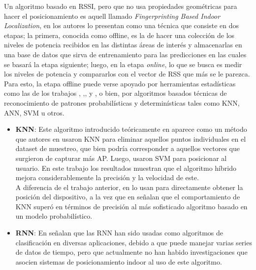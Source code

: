 \begin{enumerate}
{\begin{itemize}
{        Un algoritmo basado en \ac{RSSI}, pero que no usa propiedades geométricas para hacer el posicionamiento es aquell llamado \textit{Fingerprinting Based Indoor Localization}, en \cite{6} los autores lo presentan como una técnica que consiste en dos etapas; la primera, conocida como offline, es la de hacer una colección de los niveles de potencia recibidos en las distintas áreas de interés y almacenarlas en una base de datos que sirva de entrenamiento para las predicciones en las cuales se basará la etapa siguiente; luego, en la etapa \textit{online}, lo que se busca es medir los niveles de potencia y compararlos con el vector de \ac{RSS} que más se le parezca.\\
        
        Para esto, la etapa offline puede verse apoyado por herramientas estadísticas como las de los trabajos \cite{8}, \cite{10},\cite{11},\cite{12} y \cite{14}, o bien, por algoritmos basados técnicas de reconocimiento de patrones probabilísticas y determinísticas tales como KNN, ANN, SVM u otros.\\
        
        \begin{itemize}
            \item {\textbf{\ac{KNN}}: Este algoritmo introducido teóricamente en \cite{7} aparece como un método que autores en \cite{23} usaron KNN para eliminar aquellos puntos individuales en el dataset de muestreo, que bien podría corresponder a aquellos vectores que surgieron de capturar más AP. Luego, usaron SVM para posicionar al usuario. En este trabajo los resultados muestran que el algoritmo híbrido mejora considerablemente la precisión y la velocidad de este.\\
            
            A diferencia de el trabajo anterior, en \cite{24} lo usan para directamente obtener la posición del dispositivo, a la vez que en \cite{25} señalan que el comportamiento de KNN superó en términos de precisión al más sofisticado algoritmo basado en un modelo probabilístico.\\}
            
            \item {\textbf{\ac{RNN}}: \label{RNN} En \cite{15} señalan que las RNN han sido usadas como algoritmos de clasificación en diversas aplicaciones, debido a que puede manejar varias series de datos de tiempo, pero que actualmente no han habido investigaciones que asocien sistemas de posicionamiento indoor al uso de este algoritmo.\\
            
}
\end{itemize}}
\end{itemize}}
\end{enumerate}
